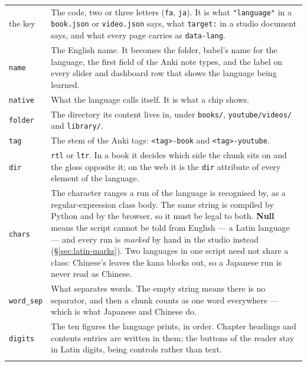\documentclass[11pt,oneside]{report}
\newcommand{\file}[1]{\texttt{#1}}
\begin{document}
\begin{center}
\small
\begin{longtable}{@{}>{\raggedright\arraybackslash}p{}p{}@{}}
\toprule
\textsf{the key} & The code, two or three letters (\texttt{fa}, \texttt{ja}).
  It is what \texttt{"language"} in a \file{book.json} or \file{video.json}
  says, what \texttt{target:} in a studio document says, and what every page
  carries as \texttt{data-lang}. \\
\addlinespace
\texttt{name} & The English name. It becomes the folder, babel's name for the
  language, the first field of the Anki note types, and the label on every
  slider and dashboard row that shows the language being learned. \\
\addlinespace
\texttt{native} & What the language calls itself. It is what a chip shows. \\
\addlinespace
\texttt{folder} & The directory its content lives in, under \file{books/},
  \file{youtube/videos/} and \file{library/}. \\
\addlinespace
\texttt{tag} & The stem of the Anki tags: \texttt{<tag>-book} and
  \texttt{<tag>-youtube}. \\
\addlinespace
\texttt{dir} & \texttt{rtl} or \texttt{ltr}. In a book it decides which side
  the chunk sits on and the gloss opposite it; on the web it is the
  \texttt{dir} attribute of every element of the language. \\
\addlinespace
\texttt{chars} & The character ranges a run of the language is recognised by,
  as a regular-expression class body. The same string is compiled by Python
  and by the browser, so it must be legal to both. \textbf{Null} means the
  script cannot be told from English --- a Latin language --- and every run is
  \emph{marked} by hand in the studio instead (\S\ref{sec:latin-marks}). Two
  languages in one script need not share a class: Chinese's leaves the kana
  blocks out, so a Japanese run is never read as Chinese. \\
\addlinespace
\texttt{word\_sep} & What separates words. The empty string means there is no
  separator, and then a chunk counts as one word everywhere --- which is what
  Japanese and Chinese do. \\
\addlinespace
\texttt{digits} & The ten figures the language prints, in order. Chapter
  headings and contents entries are written in them; the buttons of the reader
  stay in Latin digits, being controls rather than text. \\
\addlinespace

\end{longtable}
\end{center}
\end{document}
